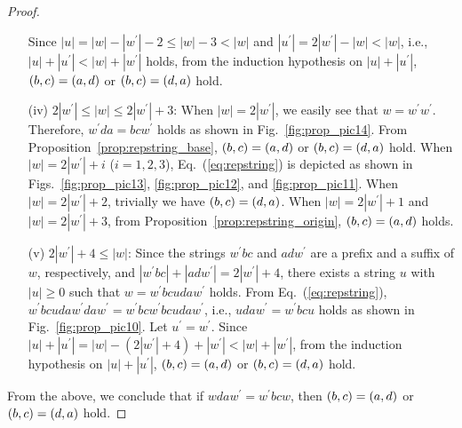 \begin{proof}
\begin{enumerate}
Since $|u| = |w| - |w^{\prime}| - 2 \leq |w| - 3 < |w|$ and $|u^{\prime}| = 2|w^{\prime}| - |w| < |w|$, i.e., $|u| + |u^{\prime}| < |w| + |w^{\prime}|$ holds, from the induction hypothesis on $|u| + |u^{\prime}|$, $(b,c) = (a,d)$ or $(b,c) = (d,a)$ hold.
%
\item[(iv)] $2|w^{\prime}| \le |w| \le 2|w^{\prime}|+3$:
When $|w|=2|w^{\prime}|$, we easily see that $w = w^{\prime}w^{\prime}$.
Therefore, $w^{\prime}da = bcw^{\prime}$ holds as shown in Fig.~\ref{fig:prop_pic14}. From Proposition~\ref{prop:repstring_base}, $(b,c) = (a,d)$ or $(b,c) = (d,a)$ hold.
When $|w|=2|w^{\prime}|+i$ ($i=1,2,3$), Eq.~(\ref{eq:repstring}) is depicted as shown in Figs.~\ref{fig:prop_pic13}, \ref{fig:prop_pic12}, and \ref{fig:prop_pic11}.
When $|w|=2|w^{\prime}|+2$, trivially we have $(b,c) = (d,a)$. 
When $|w|=2|w^{\prime}|+1$ and $|w|=2|w^{\prime}|+3$, from Proposition~\ref{prop:repstring_origin}, $(b,c) = (a,d)$ holds.
%
\item[(v)] $2|w^{\prime}|+4 \leq |w|$:
Since the strings $w^{\prime}bc$ and $adw^{\prime}$ are a prefix and a suffix of $w$, respectively, and $|w^{\prime}bc| + |adw^{\prime}| = 2|w^{\prime}| + 4$, there exists a string $u$ with $|u| \geq 0$ such that $w = w^{\prime}bcudaw^{\prime}$ holds.
From Eq.~(\ref{eq:repstring}), $w^{\prime}bcudaw^{\prime}daw^{\prime} = w^{\prime}bcw^{\prime}bcudaw^{\prime}$, i.e., $udaw^{\prime} = w^{\prime}bcu$ holds as shown in Fig.~\ref{fig:prop_pic10}.
Let $u^{\prime} = w^{\prime}$.
Since $|u| + |u^{\prime}| = |w|- (2|w^{\prime}| + 4) + |w^{\prime}| < |w| + |w^{\prime}|$, from the induction hypothesis on $|u| + |u^{\prime}|$, $(b,c) = (a,d)$ or $(b,c) = (d,a)$ hold.
\end{enumerate}
From the above, we conclude that if $wdaw^{\prime} = w^{\prime}bcw$, then $(b,c) = (a,d)$ or $(b,c) = (d,a)$ hold.
\end{proof}

